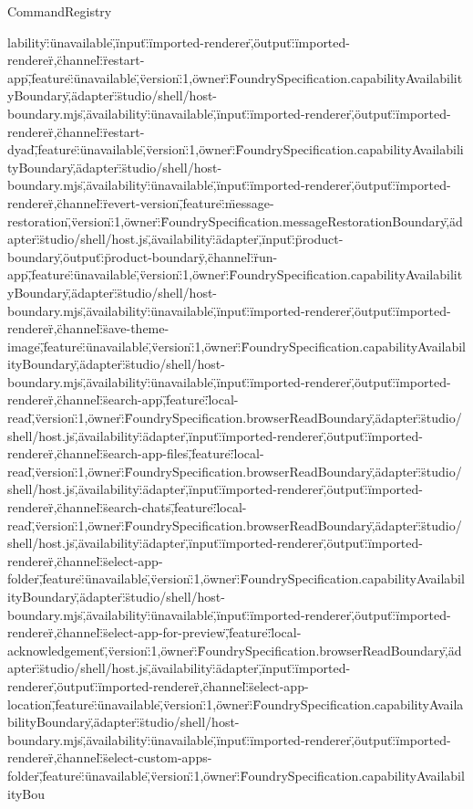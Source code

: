 \begin{lexlean}{CommandRegistry}
\begin{semanticmodule}
{lability\":\"unavailable\",\"input\":\"imported-renderer\",\"output\":\"imported-renderer\"},{\"channel\":\"restart-app\",\"feature\":\"unavailable\",\"version\":1,\"owner\":\"FoundrySpecification.capabilityAvailabilityBoundary\",\"adapter\":\"studio/shell/host-boundary.mjs\",\"availability\":\"unavailable\",\"input\":\"imported-renderer\",\"output\":\"imported-renderer\"},{\"channel\":\"restart-dyad\",\"feature\":\"unavailable\",\"version\":1,\"owner\":\"FoundrySpecification.capabilityAvailabilityBoundary\",\"adapter\":\"studio/shell/host-boundary.mjs\",\"availability\":\"unavailable\",\"input\":\"imported-renderer\",\"output\":\"imported-renderer\"},{\"channel\":\"revert-version\",\"feature\":\"message-restoration\",\"version\":1,\"owner\":\"FoundrySpecification.messageRestorationBoundary\",\"adapter\":\"studio/shell/host.js\",\"availability\":\"adapter\",\"input\":\"product-boundary\",\"output\":\"product-boundary\"},{\"channel\":\"run-app\",\"feature\":\"unavailable\",\"version\":1,\"owner\":\"FoundrySpecification.capabilityAvailabilityBoundary\",\"adapter\":\"studio/shell/host-boundary.mjs\",\"availability\":\"unavailable\",\"input\":\"imported-renderer\",\"output\":\"imported-renderer\"},{\"channel\":\"save-theme-image\",\"feature\":\"unavailable\",\"version\":1,\"owner\":\"FoundrySpecification.capabilityAvailabilityBoundary\",\"adapter\":\"studio/shell/host-boundary.mjs\",\"availability\":\"unavailable\",\"input\":\"imported-renderer\",\"output\":\"imported-renderer\"},{\"channel\":\"search-app\",\"feature\":\"local-read\",\"version\":1,\"owner\":\"FoundrySpecification.browserReadBoundary\",\"adapter\":\"studio/shell/host.js\",\"availability\":\"adapter\",\"input\":\"imported-renderer\",\"output\":\"imported-renderer\"},{\"channel\":\"search-app-files\",\"feature\":\"local-read\",\"version\":1,\"owner\":\"FoundrySpecification.browserReadBoundary\",\"adapter\":\"studio/shell/host.js\",\"availability\":\"adapter\",\"input\":\"imported-renderer\",\"output\":\"imported-renderer\"},{\"channel\":\"search-chats\",\"feature\":\"local-read\",\"version\":1,\"owner\":\"FoundrySpecification.browserReadBoundary\",\"adapter\":\"studio/shell/host.js\",\"availability\":\"adapter\",\"input\":\"imported-renderer\",\"output\":\"imported-renderer\"},{\"channel\":\"select-app-folder\",\"feature\":\"unavailable\",\"version\":1,\"owner\":\"FoundrySpecification.capabilityAvailabilityBoundary\",\"adapter\":\"studio/shell/host-boundary.mjs\",\"availability\":\"unavailable\",\"input\":\"imported-renderer\",\"output\":\"imported-renderer\"},{\"channel\":\"select-app-for-preview\",\"feature\":\"local-acknowledgement\",\"version\":1,\"owner\":\"FoundrySpecification.browserReadBoundary\",\"adapter\":\"studio/shell/host.js\",\"availability\":\"adapter\",\"input\":\"imported-renderer\",\"output\":\"imported-renderer\"},{\"channel\":\"select-app-location\",\"feature\":\"unavailable\",\"version\":1,\"owner\":\"FoundrySpecification.capabilityAvailabilityBoundary\",\"adapter\":\"studio/shell/host-boundary.mjs\",\"availability\":\"unavailable\",\"input\":\"imported-renderer\",\"output\":\"imported-renderer\"},{\"channel\":\"select-custom-apps-folder\",\"feature\":\"unavailable\",\"version\":1,\"owner\":\"FoundrySpecification.capabilityAvailabilityBou}
\end{semanticmodule}
\end{lexlean}
